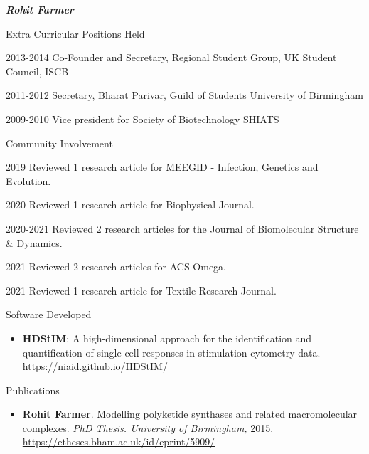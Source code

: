 \documentclass[10pt]{article}
\begin{document}
\begin{cv}{\huge \it \bfseries Rohit Farmer}
\vskip3pt
\begin{cvlist}{Extra Curricular Positions Held}
	\item[2013-2014] Co-Founder and Secretary, Regional Student Group, UK \hfill Student Council, ISCB
	\item[2011-2012] Secretary, Bharat Parivar, Guild of Students \hfill University of Birmingham
	\item[2009-2010] Vice president for Society of Biotechnology \hfill SHIATS
\end{cvlist}

\vskip3pt
\begin{cvlist}{Community Involvement}
        \item[2019] Reviewed 1 research article for MEEGID - Infection, Genetics and Evolution.
        \item[2020] Reviewed 1 research article for Biophysical Journal.
        \item[2020-2021] Reviewed 2 research articles for the Journal of Biomolecular Structure \& Dynamics.
        \item[2021] Reviewed 2 research articles for ACS Omega.
        \item[2021] Reviewed 1 research article for Textile Research Journal.
\end{cvlist}

\renewenvironment{thebibliography}[1]{
\setlength{\topsep}{0em}
\setlength{\labelsep}{.5em}
\begin{etaremune}{
\setlength{\itemsep}{0.5em}}
}{\end{etaremune}}
\renewcommand{\bibitem}[1]{\item}

\setlength{\cvlabelsep}{0mm}
\setlength{\cvlabelwidth}{0mm}
\renewcommand{\labelitemi}{}

\vskip3pt
\begin{cvlist}{Software Developed}
	\item {\begin{itemize}
			\item{\bf HDStIM}: A high-dimensional approach for the identification and quantification of single-cell responses in stimulation-cytometry data. \url{https://niaid.github.io/HDStIM/}
                \end{itemize}}
\end{cvlist}

\newpage
\vskip3pt
\begin{cvlist}{Publications}
\item {\begin{itemize}\item{\bf Rohit Farmer}. Modelling polyketide synthases and related macromolecular complexes. \emph{PhD Thesis. University of Birmingham,} 2015. \url{https://etheses.bham.ac.uk/id/eprint/5909/} \end{itemize}}


\end{cvlist}
\end{cv}
\end{document}
